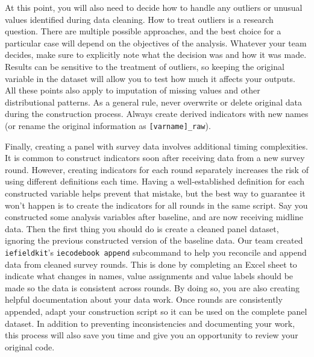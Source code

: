 At this point, you will also need to decide
how to handle any outliers or unusual values identified during data cleaning.
How to treat outliers is a research question.
There are multiple possible approaches,
and the best choice for a particular case
will depend on the objectives of the analysis.
Whatever your team decides, make sure to explicitly note
what the decision was and how it was made.
Results can be sensitive to the treatment of outliers,
so keeping the original variable in the dataset
will allow you to test how much it affects your outputs.
All these points also apply to imputation of missing values and other distributional patterns.
As a general rule, never overwrite or delete original data during the construction process.
Always create derived indicators with new names
(or rename the original information as \texttt{[varname]\_raw}).

Finally, creating a panel with survey data involves additional timing complexities.
It is common to construct indicators soon after receiving data from a new survey round.
However, creating indicators for each round separately increases the risk of using different definitions each time.
Having a well-established definition for each constructed variable helps prevent that mistake,
but the best way to guarantee it won't happen is to create the indicators for all rounds in the same script.
Say you constructed some analysis variables after baseline, and are now receiving midline data.
Then the first thing you should do is create a cleaned panel dataset,
ignoring the previous constructed version of the baseline data.
Our team created \texttt{iefieldkit}'s \texttt{iecodebook append} subcommand
to help you reconcile and append data from cleaned survey rounds.
This is done by completing an Excel sheet to indicate what changes in
names, value assignments and value labels should be made so the data is consistent across rounds.
By doing so, you are also creating helpful documentation about your data work.
Once rounds are consistently appended,
adapt your construction script so it can be used on the complete panel dataset.
In addition to preventing inconsistencies and documenting your work,
this process will also save you time and give you an opportunity to review your original code.


